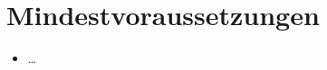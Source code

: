 \section{Mindestvoraussetzungen}

%
%


\begin{itemize}[leftmargin=*, nosep]
    \item \dots
\end{itemize}
